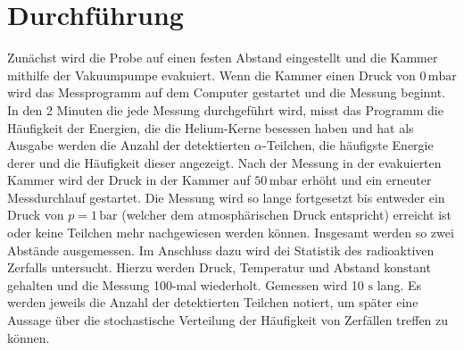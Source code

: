 \section{Durchführung}
\label{sec:Durchführung}

Zunächst wird die Probe auf einen festen Abstand eingestellt und  die Kammer mithilfe der Vakuumpumpe evakuiert.
Wenn die Kammer einen Druck von $0\,\text{m}\unit{\bar}$ wird das Messprogramm auf dem Computer gestartet und die Messung beginnt. 
In den 2 Minuten die jede Messung durchgeführt wird, misst das Programm die Häufigkeit der Energien, die die Helium-Kerne besessen haben und hat als Ausgabe werden die Anzahl der 
detektierten $\alpha$-Teilchen, die häufigste Energie derer und die Häufigkeit dieser angezeigt.
Nach der Messung in der evakuierten Kammer wird der Druck in der Kammer auf $50\, \text{m}\unit{\bar}$ erhöht und ein erneuter Messdurchlauf gestartet.
Die Messung wird so lange fortgesetzt bis entweder ein Druck von $p= 1\, \unit{\bar}$ (welcher dem atmosphärischen Druck entspricht) erreicht ist oder keine Teilchen mehr nachgewiesen werden können.
Insgesamt werden so zwei Abstände ausgemessen.
Im Anschluss dazu wird dei Statistik des radioaktiven Zerfalls untersucht.
Hierzu werden Druck, Temperatur und Abstand konstant gehalten und die Messung 100-mal wiederholt.
Gemessen wird 10 $\unit{\second}$ lang.
Es werden jeweils die Anzahl der detektierten Teilchen notiert, um später eine Aussage über die stochastische Verteilung der Häufigkeit von Zerfällen treffen zu können.
